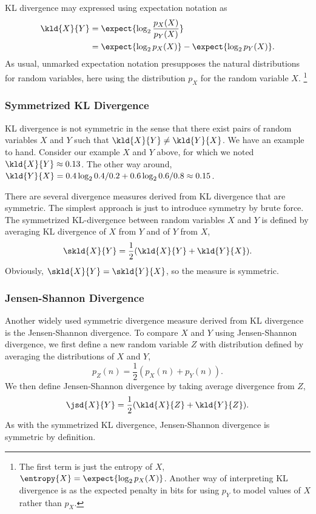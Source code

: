 KL divergence may expressed using expectation notation as
%
\begin{align}
\kld{X}{Y} 
&= \expect{\log_2 \frac{p_X(X)}{p_Y(X)}}
\\
&= \expect{\log_2 p_X(X)} - \expect{\log_2 p_Y(X)}.
\end{align}
%
As usual, unmarked expectation notation presupposes the natural
distributions for random variables, here using the distribution $p_X$
for the random variable $X$.%
%
\footnote{The first term is just the entropy of $X$,
$\entropy{X} = \expect{\log_2 p_X(X)}$.  Another way of interpreting
KL divergence is as the expected penalty in bits for using $p_Y$ to
model values of $X$ rather than $p_X$.}

\subsubsection{Symmetrized KL Divergence}\label{section:stats-symmetrized-kl-divergence}

KL divergence is not symmetric in the sense that there exist pairs of
random variables $X$ and $Y$ such that $\kld{X}{Y} \neq \kld{Y}{X}$.
We have an example to hand.  Consider our example $X$ and $Y$ above,
for which we noted $\kld{X}{Y} \approx 0.13$.  The other way around,
$\kld{Y}{X} = 0.4 \log_2 0.4/0.2 + 0.6 \log_2 0.6/0.8 \approx 0.15$.

There are several divergence measures derived from KL divergence that
are symmetric.  The simplest approach is just to introduce symmetry
by brute force.  The symmetrized KL-divergence between random variables
$X$ and $Y$ is defined by averaging KL divergence of $X$ from $Y$
and of $Y$ from $X$,
%
\begin{equation}
\skld{X}{Y} = \frac{1}{2}(\kld{X}{Y} + \kld{Y}{X}).
\end{equation}
%
Obviously, $\skld{X}{Y} = \skld{Y}{X}$, so the measure is symmetric.


\subsubsection{Jensen-Shannon Divergence}

Another widely used symmetric divergence measure derived from KL divergence
is the Jensen-Shannon divergence.  To compare $X$ and $Y$ using Jensen-Shannon
divergence, we first define a new random variable $Z$ with distribution defined by
averaging the distributions of $X$ and $Y$,
%
\[
p_Z(n) = \frac{1}{2}(p_X(n) + p_Y(n)).
\]
%
We then define Jensen-Shannon divergence by taking average divergence
from $Z$,
%
\begin{equation}
\jsd{X}{Y} = \frac{1}{2}(\kld{X}{Z} + \kld{Y}{Z}).
\end{equation}
%
As with the symmetrized KL divergence, Jensen-Shannon divergence is
symmetric by definition.


